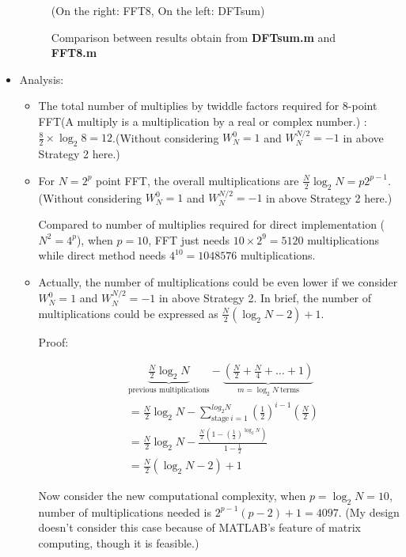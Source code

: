 \documentclass[onecolumn,oneside]{SUSTechHomework}
\begin{document}
\begin{itemize}
\begin{figure}[H]
		\caption{Comparison between results obtain from \textbf{DFTsum.m} and \textbf{FFT8.m}}
		(On the right: FFT8, On the left: DFTsum)
	\end{figure}
	\item Analysis: 
	\begin{itemize}
		\item The total number of multiplies by twiddle factors required for 8-point FFT(A multiply is a multiplication by a real or complex number.) : 
		$\frac{8}{2}\times\log_2 8=12$.(Without considering $W_N^0=1$ and $W_N^{N/2}=-1$ in above Strategy 2 here.)
		\item For $N=2^p$ point FFT, the overall multiplications are $\frac{N}{2}\log_2N=p2^{p-1}$.(Without considering $W_N^0=1$ and $W_N^{N/2}=-1$ in above Strategy 2 here.)\par
		Compared to number of multiplies required for direct implementation ($N^2=4^p$), when $p=10$, FFT just needs $10\times 2^9=5120$ multiplications while direct method
		needs $4^{10}=1048576$ multiplications. 
		\item Actually, the number of multiplications could be even lower if we consider $W_N^0=1$ and $W_N^{N/2}=-1$ in above Strategy 2. 
		In brief, the number of multiplications could be expressed as $\frac{N}{2}\left(\log_2N-2\right)+1$.\par
		Proof:
		
		\begin{equation}
			\begin{aligned}
				&\underbrace{\frac{N}{2}\log_2N}_{\text{previous multiplications}}
				-\underbrace{\left(\frac{N}{2}+\frac{N}{4}+\dots+1\right)}_{m=\log_2N\ \text{terms}}\nonumber\\
				&= \frac{N}{2}\log_2N-\sum_{\text{stage}\ i=1}^{log_2N}\left(\frac{1}{2}\right)^{i-1}\left(\frac{N}{2}\right)\\
				&= \frac{N}{2}\log_2N-\frac{\frac{N}{2}\left(1-\left(\frac{1}{2}\right)^{\log_2N}\right)}{1-\frac{1}{2}}\\
				&= \frac{N}{2}\left(\log_2N-2\right)+1
			\end{aligned}
		\end{equation}

		Now consider the new computational complexity, when $p=\log_2N=10$, number of multiplications needed is $2^{p-1}(p-2)+1=4097$.
		(My design doesn't consider this case because of MATLAB's feature of matrix computing, though it is feasible.)
	\end{itemize}	
\end{itemize}
\end{document}
